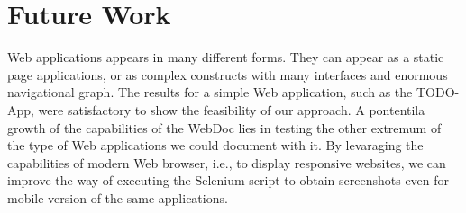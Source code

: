 \section{Future Work}\label{sec:futwork}

Web applications appears in many different forms. They can appear as a static page applications, or as complex constructs with many interfaces and enormous navigational graph. The results for a simple Web application, such as the TODO-App, were satisfactory to show the feasibility of our approach. A pontentila growth of the capabilities of the WebDoc lies in testing the other extremum of the type of Web applications we could document with it. By levaraging the capabilities of modern Web browser, i.e., to display responsive websites, we can improve the way of executing the Selenium script to obtain screenshots even for mobile version of the same applications.

